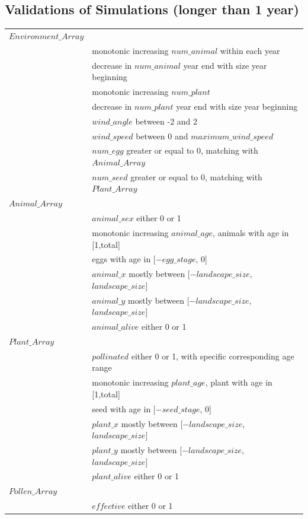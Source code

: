 \documentclass[3p,,preprint,12pt]{elsarticle}
\begin{document}
\subsection{\textbf{Validations of Simulations (longer than 1 year)}}
\begin{table} [!htb]
\begin{tabular}{ l l }
 $Environment\_Array$ & \\
 & monotonic increasing $num\_animal$ within each year\\
 & decrease in $num\_animal$ year end with size year beginning\\
 & monotonic increasing $num\_plant$\\
 & decrease in $num\_plant$ year end with size year beginning\\
 & $wind\_angle$ between -2 and 2 \\
 & $wind\_speed$ between 0 and $maximum\_wind\_speed$\\
 & $num\_egg$ greater or equal to 0, matching with $Animal\_Array$\\
 & $num\_seed$ greater or equal to 0, matching with $Plant\_Array$\\
 $Animal\_Array$ & \\
 & $animal\_sex$ either 0 or 1\\
 & monotonic increasing $animal\_age$, animals with age in [1,total]\\
 & eggs with age in [$-egg\_stage$, 0]\\
 & $animal\_x$ mostly between [$-landscape\_size$, $landscape\_size$]\\
 & $animal\_y$ mostly between [$-landscape\_size$, $landscape\_size$]\\
 & $animal\_alive$ either 0 or 1\\
 $Plant\_Array$ & \\
 & $pollinated$ either 0 or 1, with specific corresponding age range\\
 & monotonic increasing $plant\_age$, plant with age in [1,total]\\
 & seed with age in [$-seed\_stage$, 0]\\
 & $plant\_x$ mostly between [$-landscape\_size$, $landscape\_size$]\\
 & $plant\_y$ mostly between [$-landscape\_size$, $landscape\_size$]\\
 & $plant\_alive$ either 0 or 1\\
 $Pollen\_Array$ & \\
 & $effective$ either 0 or 1\\

\end{tabular}
\end{table}
\end{document}
